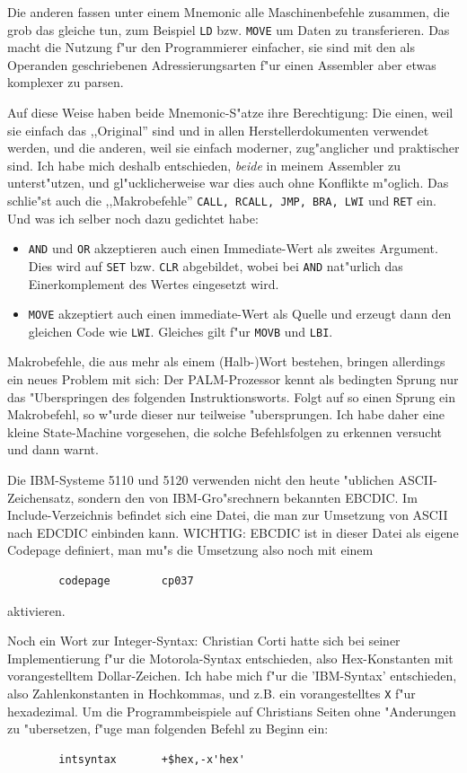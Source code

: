 \documentclass[12pt,a4paper,twoside]{report}
\begin{document}
Die anderen fassen unter einem Mnemonic alle Maschinenbefehle
zusammen, die grob das gleiche tun, zum Beispiel {\tt LD} bzw.
{\tt MOVE} um Daten zu transferieren.  Das macht die Nutzung f"ur
den Programmierer einfacher, sie sind mit den als Operanden
geschriebenen Adressierungsarten f"ur einen Assembler aber etwas
komplexer zu parsen.

Auf diese Weise haben beide Mnemonic-S"atze ihre Berechtigung: Die
einen, weil sie einfach das ,,Original'' sind und in allen
Herstellerdokumenten verwendet werden, und die anderen, weil sie
einfach moderner, zug"anglicher und praktischer sind.  Ich habe mich
deshalb entschieden, {\em beide} in meinem Assembler zu unterst"utzen,
und gl"ucklicherweise war dies auch ohne Konflikte m"oglich.  Das
schlie"st auch die ,,Makrobefehle'' {\tt CALL, RCALL, JMP, BRA, LWI}
und {\tt RET} ein.  Und was ich selber noch dazu gedichtet habe:
\begin{itemize}
\item{{\tt AND} und {\tt OR} akzeptieren auch einen Immediate-Wert als zweites
      Argument.  Dies wird auf {\tt SET} bzw. {\tt CLR} abgebildet, wobei bei
      {\tt AND} nat"urlich das Einerkomplement des Wertes eingesetzt wird.}
\item{{\tt MOVE} akzeptiert auch einen immediate-Wert als Quelle und erzeugt
      dann den gleichen Code wie {\tt LWI}.  Gleiches gilt f"ur {\tt MOVB} und
      {\tt LBI}.}
\end{itemize}
Makrobefehle, die aus mehr als einem (Halb-)Wort bestehen, bringen
allerdings ein neues Problem mit sich: Der PALM-Prozessor kennt als
bedingten Sprung nur das "Uberspringen des folgenden Instruktionsworts. 
Folgt auf so einen Sprung ein Makrobefehl, so w"urde dieser nur
teilweise "ubersprungen.  Ich habe daher eine kleine State-Machine
vorgesehen, die solche Befehlsfolgen zu erkennen versucht und dann
warnt.

Die IBM-Systeme 5110 und 5120 verwenden nicht den heute "ublichen
ASCII-Zeichensatz, sondern den von IBM-Gro"srechnern bekannten
EBCDIC.  Im Include-Verzeichnis befindet sich eine Datei, die man
zur Umsetzung von ASCII nach EDCDIC einbinden kann.  WICHTIG:
EBCDIC ist in dieser Datei als eigene Codepage definiert, man
mu"s die Umsetzung also noch mit einem
\begin{verbatim}
        codepage        cp037
\end{verbatim}
aktivieren.

Noch ein Wort zur Integer-Syntax: Christian Corti hatte sich bei seiner
Implementierung f"ur die Motorola-Syntax entschieden, also
Hex-Konstanten mit vorangestelltem Dollar-Zeichen.  Ich habe mich f"ur
die 'IBM-Syntax' entschieden, also Zahlenkonstanten in Hochkommas, und z.B. 
ein vorangestelltes {\tt X} f"ur hexadezimal.  Um die Programmbeispiele
auf Christians Seiten ohne "Anderungen zu "ubersetzen, f"uge man
folgenden Befehl zu Beginn ein:
\begin{verbatim}
        intsyntax       +$hex,-x'hex'
\end{verbatim}
\end{document}
